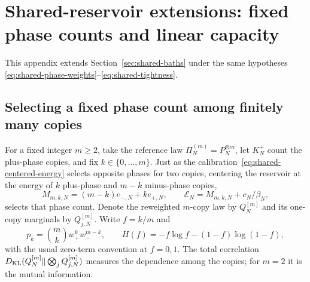 \section{Shared-reservoir extensions: fixed phase counts and linear capacity}
\label{app:shared-extensions}

This appendix extends Section~\ref{sec:shared-baths} under the same
hypotheses \eqref{eq:shared-phase-weights}--\eqref{eq:shared-tightness}.

\subsection{Selecting a fixed phase count among finitely many copies}

For a fixed integer $m\ge2$, take the reference law
$\Pi_N^{(m)}=P_N^{\otimes m}$, let $K^+_N$ count the plus-phase copies,
and fix $k\in\{0,\ldots,m\}$. Just as the
calibration~\eqref{eq:shared-centered-energy} selects opposite phases
for two copies, centering the reservoir at the energy of $k$
plus-phase and $m-k$ minus-phase copies,
\begin{equation}
 M_{m,k,N}=(m-k)e_{-,N}+k e_{+,N},\qquad
 \mathcal E_N=M_{m,k,N}+c_N/\beta_N,
 \label{eq:shared-count-calibration}
\end{equation}
selects that phase count.
Denote the reweighted $m$-copy law by $Q_N^{[m]}$ and its one-copy
marginals by $Q_{j,N}^{[m]}$. Write $f=k/m$ and
\begin{equation}
 p_k=\binom mk w_+^k w_-^{m-k},\qquad
 H(f)=-f\log f-(1-f)\log(1-f),
 \label{eq:shared-count-constants}
\end{equation}
with the usual zero-term convention at $f=0,1$. The total correlation
$D_{\mathrm{KL}}(Q_N^{[m]}\Vert\bigotimes_jQ_{j,N}^{[m]})$ measures the dependence
among the copies; for $m=2$ it is the mutual information.

